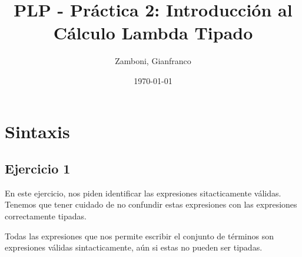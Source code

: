 \documentclass[10pt,a4paper, landscape]{article}
\begin{document}
\title{PLP - Práctica 2: Introducción al Cálculo Lambda Tipado}

\date{\today}

\author{Zamboni, Gianfranco}

\maketitle
\setcounter{page}{1}


\section*{\centering Sintaxis}
\subsection{Ejercicio 1}
\begin{multicols}{2}
En este ejercicio, nos piden identificar las expresiones sitacticamente válidas. Tenemos que tener cuidado de no confundir estas expresiones con las expresiones correctamente tipadas. 

Todas las expresiones que nos permite escribir el conjunto de términos son expresiones válidas sintacticamente, aún si estas no pueden ser tipadas.

\end{multicols}
\end{document}
